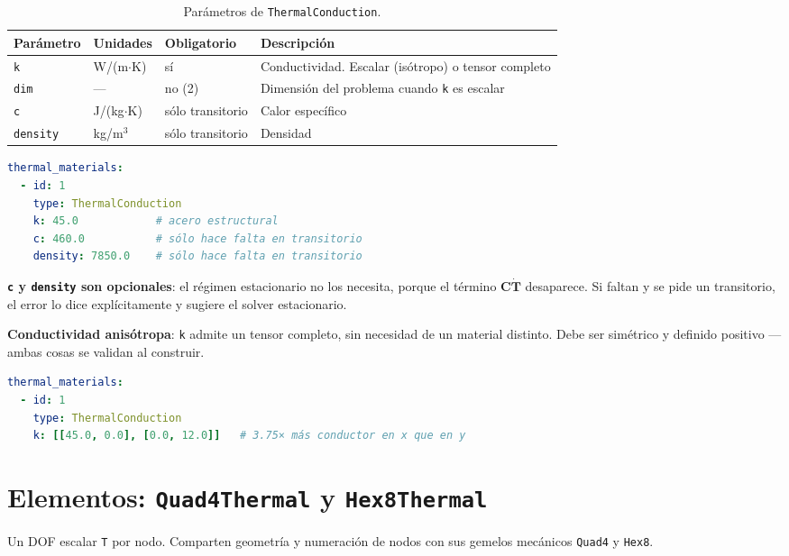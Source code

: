 \documentclass[11pt,oneside]{report}
\begin{document}
\begin{table}[h]
\centering
\caption{Parámetros de \texttt{ThermalConduction}.}
\begin{tabularx}{\textwidth}{YYYY}
\hline
\textbf{Parámetro} & \textbf{Unidades} & \textbf{Obligatorio} & \textbf{Descripción} \\
\hline
\texttt{k} & W/(m\ensuremath{\cdot}K) & sí & Conductividad. Escalar (isótropo) o tensor completo \\
\texttt{dim} & --- & no (2) & Dimensión del problema cuando \texttt{k} es escalar \\
\texttt{c} & J/(kg\ensuremath{\cdot}K) & sólo transitorio & Calor específico \\
\texttt{density} & kg/m\ensuremath{^{3}} & sólo transitorio & Densidad \\
\hline
\end{tabularx}
\end{table}
\begin{lstlisting}[language=yaml]
thermal_materials:
  - id: 1
    type: ThermalConduction
    k: 45.0            # acero estructural
    c: 460.0           # sólo hace falta en transitorio
    density: 7850.0    # sólo hace falta en transitorio

\end{lstlisting}

\textbf{\texttt{c} y \texttt{density} son opcionales}: el régimen estacionario no los necesita, porque el término $\mathbf C\dot{\mathbf T}$ desaparece. Si faltan y se pide un transitorio, el error lo dice explícitamente y sugiere el solver estacionario.

\textbf{Conductividad anisótropa}: \texttt{k} admite un tensor completo, sin necesidad de un material distinto. Debe ser simétrico y definido positivo --- ambas cosas se validan al construir.

\begin{lstlisting}[language=yaml]
thermal_materials:
  - id: 1
    type: ThermalConduction
    k: [[45.0, 0.0], [0.0, 12.0]]   # 3.75× más conductor en x que en y

\end{lstlisting}

\section{Elementos: \texttt{Quad4Thermal} y \texttt{Hex8Thermal}}

Un DOF escalar \texttt{T} por nodo. Comparten geometría y numeración de nodos con sus gemelos mecánicos \texttt{Quad4} y \texttt{Hex8}.
\end{document}
